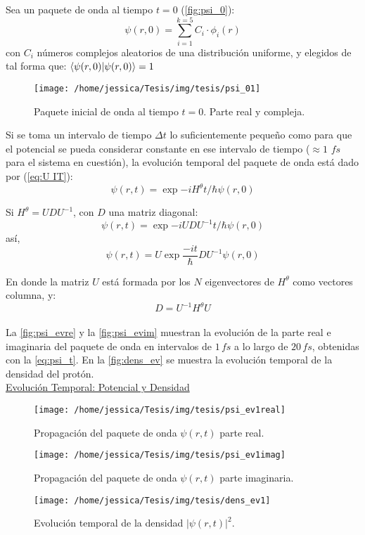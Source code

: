 Sea un paquete de onda al tiempo $t=0$ (\autoref{fig:psi_0}): 
\begin{equation}
  \label{eq:psi_0}
\psi(r,0)=\sum_{i=1}^{k=5}C_i \cdot \phi_{i}(r)
\end{equation}
con $C_i$ números complejos aleatorios de una distribución uniforme, y elegidos de tal forma que: $\bra{\psi(r,0)}\ket{\psi(r,0)}=1$
\begin{figure}[!htbp]
  \centering
  \texttt{[image: /home/jessica/Tesis/img/tesis/psi\_01]}
  \caption{Paquete inicial de onda al tiempo $t=0$. Parte real y compleja.}
  \label{fig:psi_0}
\end{figure}

Si se toma un intervalo de tiempo $\Delta t$ lo suficientemente pequeño como para que el potencial se pueda considerar constante en ese intervalo de tiempo ($\approx 1\,\,fs$ para el sistema en cuestión), la evolución temporal del paquete de onda está dado por (\autoref{eq:U IT}):
\begin{equation}
  \label{eq:wp_ev}
  \psi(r,t)=\exp{-iH^{\theta}t/\hbar}\psi(r,0)
\end{equation}

Si $H^{\theta} = UDU^{-1}$, con $D$ una matriz diagonal:
$$ \psi(r,t) = \exp{-iUDU^{-1}t/\hbar}\psi(r,0)$$  
así,
\begin{equation}
  \label{eq:psi_t}
\psi(r,t) = U\exp{\frac{-it}{\hbar}D}U^{-1}\psi(r,0)
\end{equation}

En donde la matriz $U$ está formada por los $N$ eigenvectores de $H^{\theta}$ como vectores columna, y:
$$D=U^{-1}H^{\theta}U$$
\\

La \autoref{fig:psi_evre} y la \autoref{fig:psi_evim} muestran la evolución de la parte real e imaginaria del paquete de onda en intervalos de $1\,fs$ a lo largo de $20\,fs$, obtenidas con la \autoref{eq:psi_t}. En la \autoref{fig:dens_ev} se muestra la evolución temporal de la densidad del protón.\\
\href{https://github.com/Jessi-MM/PropagatorLearning/blob/main/src/Animacion/gifs/animation-dens\%26pot.gif}{\faPlayCircle[regular] Evolución Temporal: Potencial y Densidad}

\begin{figure}[!htbp]
  \centering
  \texttt{[image: /home/jessica/Tesis/img/tesis/psi\_ev1real]}
  \caption{Propagación del paquete de onda $\psi(r,t)$ parte real.}
  \label{fig:psi_evre}
\end{figure}

\begin{figure}[!htbp]
  \centering
  \texttt{[image: /home/jessica/Tesis/img/tesis/psi\_ev1imag]}
  \caption{Propagación del paquete de onda $\psi(r,t)$ parte imaginaria.}
  \label{fig:psi_evim}
\end{figure}

\begin{figure}[!htbp]
  \centering
  \texttt{[image: /home/jessica/Tesis/img/tesis/dens\_ev1]}
  \caption{Evolución temporal de la densidad $|\psi(r,t)|^2$.}
  \label{fig:dens_ev}
\end{figure}
